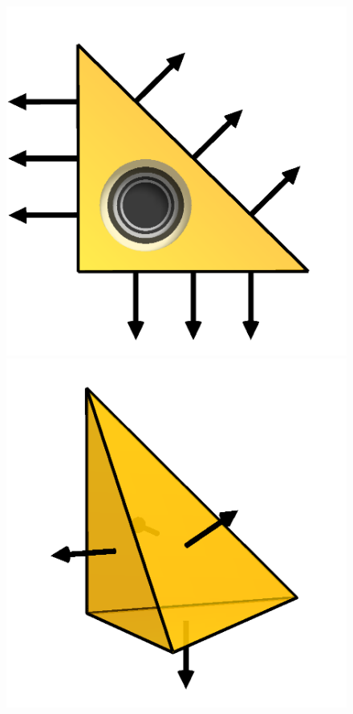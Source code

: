 \begin{figure}
  \includegraphics[width=\threefigs]{chapters/kirby-6/png/RT3_2d.png} \\
  \includegraphics[width=\threefigs]{chapters/kirby-6/png/RT1_3d.png}

\end{figure}
